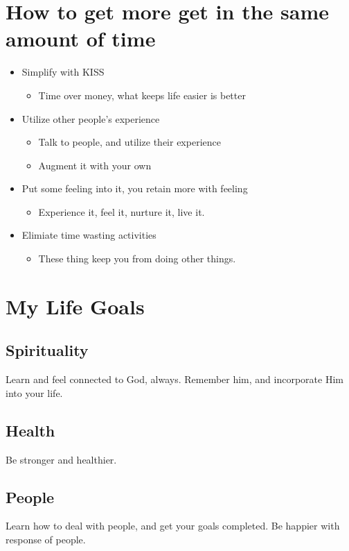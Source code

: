\documentclass[11pt]{article}
\begin{document}
\section{How to get more get in the same amount of time}
\label{sec:org502d3d2}
\begin{itemize}
\item Simplify with KISS
\begin{itemize}
\item Time over money, what keeps life easier is better
\end{itemize}
\item Utilize other people's experience
\begin{itemize}
\item Talk to people, and utilize their experience
\item Augment it with your own
\end{itemize}
\item Put some feeling into it, you retain more with feeling
\begin{itemize}
\item Experience it, feel it, nurture it, live it.
\end{itemize}
\item Elimiate time wasting activities
\begin{itemize}
\item These thing keep you from doing other things.
\end{itemize}
\end{itemize}

\section{My Life Goals}
\label{sec:org5ce9a14}
\subsection{Spirituality}
\label{sec:orgebb7983}
Learn and feel connected to God, always. Remember him, and
incorporate Him into your life.
\subsection{Health}
\label{sec:orgdea2128}
Be stronger and healthier. 
\subsection{People}
\label{sec:orga1abaff}
Learn how to deal with people, and get your goals completed. Be
happier with response of people.
\end{document}
